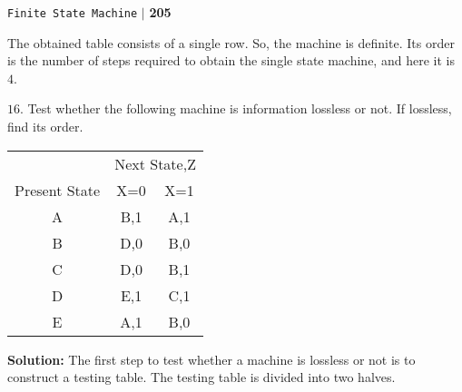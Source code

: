 \documentclass{article}
\begin{document}
\begin{flushright}
\texttt{Finite State Machine} \hspace*{0.1cm}\textbf{$|$} \hspace*{0.1cm} \textbf{205}\hspace*{0.1cm}
\end{flushright}
\vspace*{0.5cm}



\hspace*{0.5cm} The obtained table consists of a single row. So, the machine is definite. Its order is the number of steps required to obtain the single state machine, and here it is $4$.



$16.$ Test whether the following machine is information lossless or not. If lossless, find its order.


\begin{center}
\begin{tabular}{ccc}
 \hline

 \hline

 \hline

 \hline
 & \multicolumn{2}{c}{Next State,Z}\\
 \cline{2-3}
Present State & X=0           &   X=1\\
\hline
    A    &  B,1  & A,1 \\
    B    &  D,0  & B,0 \\
    C    &  D,0  & B,1 \\
    D    &  E,1  & C,1 \\
    E    &  A,1  & B,0 \\
 \hline

 \hline

 \hline

 \hline
\end{tabular}
\end{center}

\large{\textbf{Solution:}} The first step to test whether a machine is lossless or not is to construct a testing table. The testing table is divided
into two halves.
\end{document}
